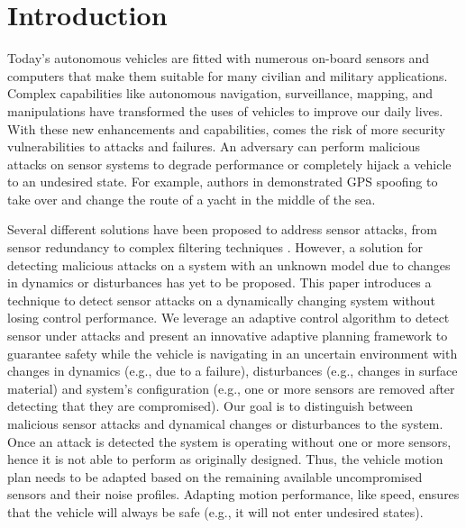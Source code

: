 
\section{Introduction} \label{sec:introduction}

Today's autonomous vehicles are fitted with numerous on-board sensors and computers that make them suitable for many civilian and military applications. Complex capabilities like autonomous navigation, surveillance, mapping, and manipulations have transformed the uses of vehicles to improve our daily lives. 
With these new enhancements and capabilities, comes the risk of more security vulnerabilities to attacks and failures. An adversary can perform malicious attacks on sensor systems to degrade performance or completely hijack a vehicle to an undesired state. For example, authors in \cite{lee} demonstrated GPS spoofing to take over and change the route of a yacht in the middle of the sea.



Several different solutions have been proposed to address sensor attacks, from sensor redundancy to complex filtering techniques \cite{fawzi2014secure,6943080,7330811}. However, a solution for detecting malicious attacks on a system with an unknown model due to changes in dynamics or disturbances has yet to be proposed. This paper introduces a technique to detect sensor attacks on a dynamically changing system without losing control performance. We leverage an adaptive control algorithm to detect sensor under attacks and present an innovative adaptive planning framework to guarantee safety while the vehicle is navigating in an uncertain environment with changes in dynamics (e.g., due to a failure), disturbances (e.g., changes in surface material) and system's configuration (e.g., one or more sensors are removed after detecting that they are compromised). 
Our goal is to distinguish between malicious sensor attacks and dynamical changes or disturbances to the system. Once an attack is detected the system is operating without one or more sensors, hence it is not able to perform as originally designed.  Thus, the vehicle motion plan needs to be adapted based on the remaining available uncompromised sensors and their noise profiles. Adapting motion performance, like speed, ensures that the vehicle will always be safe (e.g., it will not enter undesired states). 

